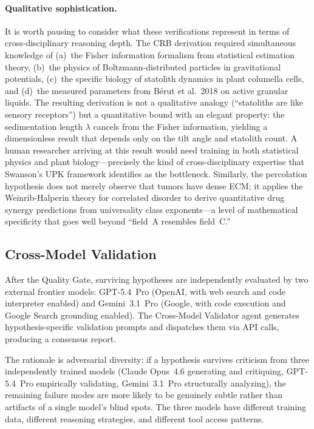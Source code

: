\paragraph{Qualitative sophistication.} It is worth pausing to consider what these verifications represent in terms of cross-disciplinary reasoning depth. The CRB derivation required simultaneous knowledge of (a)~the Fisher information formalism from statistical estimation theory, (b)~the physics of Boltzmann-distributed particles in gravitational potentials, (c)~the specific biology of statolith dynamics in plant columella cells, and (d)~the measured parameters from B\'{e}rut et al.~2018 on active granular liquids. The resulting derivation is not a qualitative analogy (``statoliths are like sensory receptors'') but a quantitative bound with an elegant property: the sedimentation length $\lambda$ cancels from the Fisher information, yielding a dimensionless result that depends only on the tilt angle and statolith count. A human researcher arriving at this result would need training in both statistical physics and plant biology---precisely the kind of cross-disciplinary expertise that Swanson's UPK framework identifies as the bottleneck. Similarly, the percolation hypothesis does not merely observe that tumors have dense ECM; it applies the Weinrib-Halperin theory for correlated disorder to derive quantitative drug synergy predictions from universality class exponents---a level of mathematical specificity that goes well beyond ``field~A resembles field~C.''

\subsection{Cross-Model Validation}
\label{sec:cross_model}

After the Quality Gate, surviving hypotheses are independently evaluated by two external frontier models: GPT-5.4~Pro (OpenAI, with web search and code interpreter enabled) and Gemini~3.1~Pro (Google, with code execution and Google Search grounding enabled). The Cross-Model Validator agent generates hypothesis-specific validation prompts and dispatches them via API calls, producing a consensus report.

The rationale is adversarial diversity: if a hypothesis survives criticism from three independently trained models (Claude Opus~4.6 generating and critiquing, GPT-5.4~Pro empirically validating, Gemini~3.1~Pro structurally analyzing), the remaining failure modes are more likely to be genuinely subtle rather than artifacts of a single model's blind spots. The three models have different training data, different reasoning strategies, and different tool access patterns.

